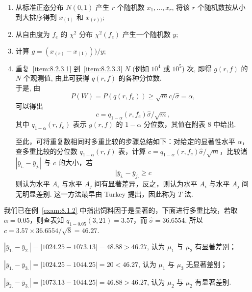 \begin{enumerate}[label=\color{structurecolor}(\arabic*)]
  \item 从标准正态分布 $N(0,1)$ 产生 $r$ 个随机数 $x_1,\ldots, x_r$, 将该 $r$ 个随机数按从小到大排序得到 $x_{(1)}$ 和 $x_{(r))}$; \label{item:8.2.3.1}
  \item 从自由度为 $f_e$ 的 $\chi^2$ 分布 $\chi^2(f_e)$ 产生一个随机数 $y$; \label{item:8.2.3.2}
  \item 计算 $g =(x_{(r)}-x_{(1)}))/y$; \label{item:8.2.3.3}
  \item 重复~\ref{item:8.2.3.1} 到~\ref{item:8.2.3.3} $N$ (例如 $10^4$ 或 $10^5$) 次, 即得 $g(r,f)$ 的 $N$ 个观测值, 由此可获得 $q(r,f)$ 的各种分位数.\\
  于是, 由
  \begin{equation}\label{eq:8.2.3}
    P(W) = P(q(r,f_e)) \geq \sqrt{m} c/\hat{\sigma} = \alpha,
  \end{equation}
  可以得出
  \begin{equation}\label{eq:8.2.4}
    c = q_{1-\alpha}(r,f_e) \hat{\sigma}/\sqrt{m},
  \end{equation}
  其中 $q_{1-\alpha}(r,f_e)$ 表示 $g(r,f)$ 的 $1-\alpha$ 分位数，其值在附表 8 中给出.

至此，可将重复数相同时多重比较的步骤总结如下：对给定的显著性水平 $\alpha$，查多重比较的分位数 $q_{1-\alpha}(r,f)$ 表，计算 $c = q_{1-\alpha}(r,f_e)\hat{\sigma}/\sqrt{m}$，比较诸 $|\bar{y}_{i.} - \bar{y}_{j.}|$ 与 $c$ 的大小，若
\begin{equation*}
  |\bar{y}_{i.} - \bar{y}_{j.} \geq c
\end{equation*}
则认为水平 $A_i$ 与水平 $A_j$ 间有显著差异，反之，则认为水平 $A_i$ 与水平 $A_j$ 间无明显差别. 这一方法最早由 Turkey 提出，因此称为 $T$ 法.
\end{enumerate}

\begin{example}
  我们已在例~\ref{exam:8.1.2} 中指出饲料因于是显著的，下面进行多重比较，若取 $\alpha=0.05$，则查表知 $q_{1-0.05}(3,21)=3.57$，而 $\hat{\sigma} = 36.6554$. 所以 $c = 3.57 \times 36.6554/\sqrt{8} = 46.27$.
\end{example}

$\left|\bar{y}_{1.}-\bar{y}_{2.}\right|=|1024.25-1073.13|=48.88>46.27$, 认为 $\mu_1$ 与 $\mu_2$ 有显著差别；

$\left|\bar{y}_{1.}-\bar{y}_{3.}\right|=|1024.25-1044.25|=20<46.27$, 认为 $\mu_1$ 与 $\mu_3$ 无显著差别；

$\left|\bar{y}_{2.}-\bar{y}_{3.}\right|=|1073.13-1044.25|=46.88>46.27$, 认为 $\mu_2$ 与 $\mu_2$ 有显著差别.

